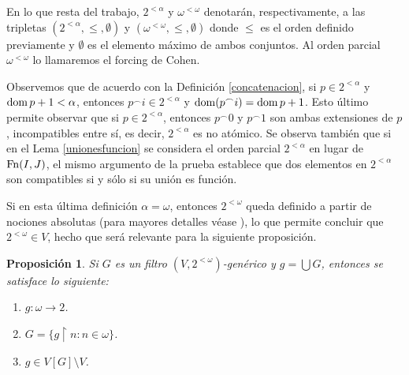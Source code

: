 \documentclass[11pt]{unam_tesis1}
\theoremstyle{MyThmStyle}
\theoremstyle{definition}
\theoremstyle{plain}
\newtheorem{proposition}[definition]{Proposici\'on}
\theoremstyle{remark}
\def\dom{\mathop{\rm dom}\nolimits}
\def\rest{\mathop{\upharpoonright}\nolimits}
\let\leq\leqslant
\begin{document}
En lo que resta del trabajo, $2^{<\alpha}$ y $\omega^{<\omega}$ denotar\'an, respectivamente, a las tripletas $(2^{<\alpha},\leq,\emptyset)$ y $(\omega^{<\omega},\leq,\emptyset)$ donde $\leq$ es el orden definido previamente y $\emptyset$ es el elemento m\'aximo de ambos conjuntos. Al orden parcial $\omega^{<\omega}$ lo llamaremos el forcing de Cohen.

Observemos que de acuerdo con la Definici\'on \ref{concatenacion}, si $p \in 2^{<\alpha}$ y $\dom p +1 < \alpha$, entonces $p^\frown i \in 2^{<\alpha}$ y $\dom(p^\frown i)=\dom p + 1$. Esto \'ultimo permite observar que si $p\in 2^{<\alpha}$, entonces $p^{\frown}0$ y $p^{\frown}1$ son ambas extensiones de $p$, incompatibles entre s\'i, es decir, $2^{<\alpha}$ es no at\'omico.  Se observa tambi\'en que si en el Lema \ref{unionesfuncion} se considera el orden parcial $2^{<\alpha}$ en lugar de ${\rm Fn}(I,J)$, el mismo argumento de la  prueba establece que dos elementos en $2^{<\alpha}$ son compatibles si y s\'olo si su uni\'on es funci\'on.

Si en esta \'ultima definici\'on $\alpha=\omega$, entonces $2^{<\omega}$ queda definido a partir de nociones absolutas (para mayores detalles v\'ease \cite[Theorem 5.1, p. 126 ]{kunen}), lo que permite concluir que $2^{<\omega}\in V$, hecho que ser\'a relevante para la siguiente proposici\'on.

\begin{proposition}\label{unnuevoreal}
Si $G$ es un filtro $(V,2^{<\omega})$-gen\'erico y $g=\bigcup G$, entonces se satisface lo siguiente:
\begin{enumerate}
\item $g:\omega \to 2$.
\item $G=\{g\rest n:n\in \omega \}$.
\item $g\in V[G]\setminus V$.
\end{enumerate}

\end{proposition}
\end{document}
